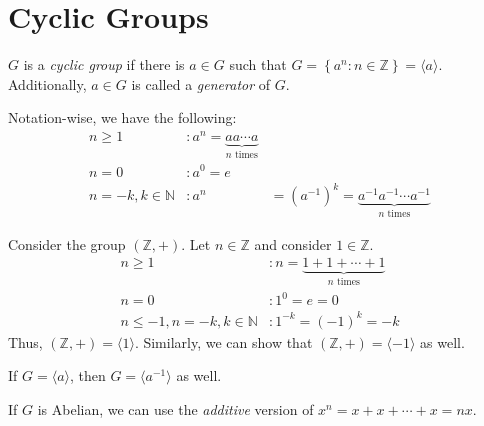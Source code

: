 \chapter{Cyclic Groups}

\begin{definition}
    \(G\) is a \textit{cyclic group} if there is \(a \in G\) such that \(G = \left\{a^n : n \in \mathbb{Z}\right\} = \langle a \rangle\). Additionally, \(a \in G\) is called a \textit{generator} of \(G\).

    Notation-wise, we have the following:
    \[
    \begin{aligned}
        n \geq 1 &: a^n = \underbrace{a a \cdots a}_\text{\(n\) times} \\
        n = 0 &: a^0 = e \\
        n = -k, k \in \mathbb{N} &: a^{n} &= (a^{-1})^k = \underbrace{a^{-1} a^{-1} \cdots a^{-1}}_\text{\(n\) times}
    \end{aligned}
    \]
\end{definition}

\begin{nexample}
    Consider the group \((\mathbb{Z}, +)\). Let \(n \in \mathbb{Z}\) and consider \(1 \in \mathbb{Z}\).
    \[
    \begin{aligned}
        n \geq 1 &: n = \underbrace{1+1+\cdots+1}_\text{\(n\) times} \\
        n = 0 &: 1^0 = e = 0 \\
        n \leq -1, n=-k, k \in \mathbb{N} &: 1^{-k} = (-1)^k = -k
    \end{aligned}
    \]
    Thus, \((\mathbb{Z}, +) = \langle 1 \rangle\). Similarly, we can show that \((\mathbb{Z}, +) = \langle -1 \rangle\) as well.
\end{nexample}

\begin{remark}
    If \(G = \langle a \rangle\), then \(G = \langle a^{-1} \rangle\) as well.
\end{remark}

\begin{remark}
    If \(G\) is Abelian, we can use the \textit{additive} version of \(x^n = x+x+\cdots+x = nx\).
\end{remark}

